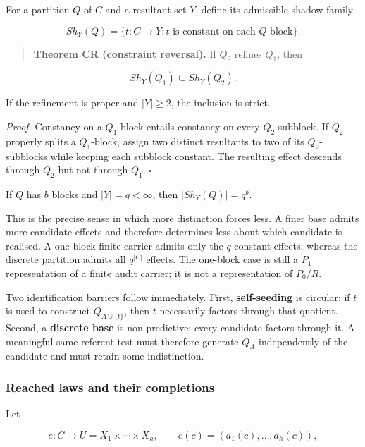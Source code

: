 \documentclass[11pt,a4paper]{article}
\begin{document}
For a partition \(Q\) of \(C\) and a resultant set \(Y\), define its
admissible shadow family

\[{Sh}_{Y}(Q) = \{ t:C \rightarrow Y:t\text{ is constant on each }Q\text{-block}\}.\]

\begin{quote}
\textbf{Theorem CR (constraint reversal).} If \(Q_{2}\) refines
\(Q_{1}\), then
\end{quote}

\[{Sh}_{Y}\left( Q_{1} \right) \subseteq {Sh}_{Y}\left( Q_{2} \right).\]

If the refinement is proper and \(|Y| \geq 2\), the inclusion is strict.

\emph{Proof.} Constancy on a \(Q_{1}\)-block entails constancy on every
\(Q_{2}\)-subblock. If \(Q_{2}\) properly splits a \(Q_{1}\)-block,
assign two distinct resultants to two of its \(Q_{2}\)-subblocks while
keeping each subblock constant. The resulting effect descends through
\(Q_{2}\) but not through \(Q_{1}\). \(\ensuremath{\square}\)

If \(Q\) has \(b\) blocks and \(|Y| = q < \infty\), then
\(|{Sh}_{Y}(Q)| = q^{b}\).

This is the precise sense in which more distinction forces less. A finer
base admits more candidate effects and therefore determines less about
which candidate is realised. A one-block finite carrier admits only the
\(q\) constant effects, whereas the discrete partition admits all
\(q^{|C|}\) effects. The one-block case is still a \(P_{1}\)
representation of a finite audit carrier; it is not a representation of
\(P_{0}/R\).

Two identification barriers follow immediately. First,
\textbf{self-seeding} is circular: if \(t\) is used to construct
\(Q_{A \cup \{ t\}}\), then \(t\) necessarily factors through that
quotient. Second, a \textbf{discrete base} is non-predictive: every
candidate factors through it. A meaningful same-referent test must
therefore generate \(Q_{A}\) independently of the candidate and must
retain some indistinction.

\subsubsection{Reached laws and their
completions}

Let

\[e:C \rightarrow U = X_{1} \times \cdots \times X_{h},\quad\quad e(c) = \left( a_{1}(c),\ldots,a_{h}(c) \right),\]
\end{document}
